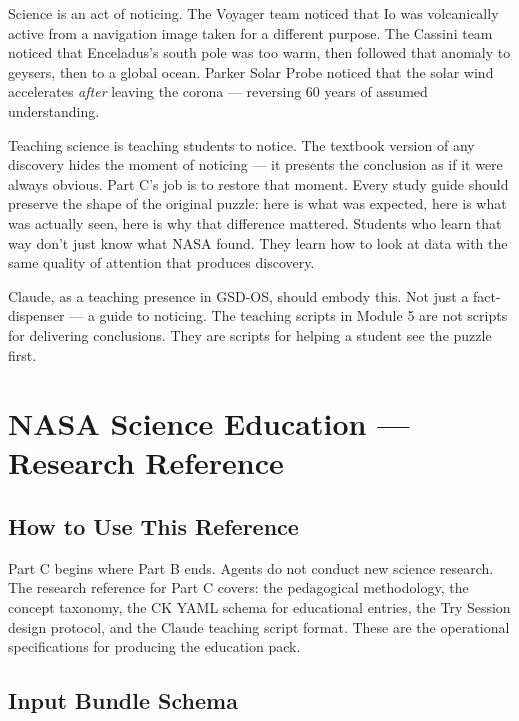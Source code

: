 \documentclass[11pt,letterpaper]{article}
\newcommand{\stageheader}[2]{%
  \noindent\colorbox{#2}{\makebox[\textwidth][l]{%
    \textcolor{white}{\bfseries\sffamily\hspace{6pt}#1\hspace{6pt}}}}%
  \vspace{0.5em}\par%
}
\begin{document}
Science is an act of noticing. The Voyager team noticed that Io was volcanically active from a navigation image taken for a different purpose. The Cassini team noticed that Enceladus's south pole was too warm, then followed that anomaly to geysers, then to a global ocean. Parker Solar Probe noticed that the solar wind accelerates \textit{after} leaving the corona --- reversing 60 years of assumed understanding.

Teaching science is teaching students to notice. The textbook version of any discovery hides the moment of noticing --- it presents the conclusion as if it were always obvious. Part C's job is to restore that moment. Every study guide should preserve the shape of the original puzzle: here is what was expected, here is what was actually seen, here is why that difference mattered. Students who learn that way don't just know what NASA found. They learn how to look at data with the same quality of attention that produces discovery.

Claude, as a teaching presence in GSD-OS, should embody this. Not just a fact-dispenser --- a guide to noticing. The teaching scripts in Module 5 are not scripts for delivering conclusions. They are scripts for helping a student see the puzzle first.

\newpage

\stageheader{STAGE 2 --- RESEARCH REFERENCE}{secondary}

\section{NASA Science Education --- Research Reference}

\subsection{How to Use This Reference}

Part C begins where Part B ends. Agents do not conduct new science research. The research reference for Part C covers: the pedagogical methodology, the concept taxonomy, the CK YAML schema for educational entries, the Try Session design protocol, and the Claude teaching script format. These are the operational specifications for producing the education pack.

\subsection{Input Bundle Schema}
\end{document}
